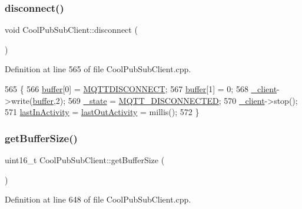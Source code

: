 \subsubsection{\texorpdfstring{disconnect()}{disconnect()}}
{\footnotesize\ttfamily void Cool\+Pub\+Sub\+Client\+::disconnect (\begin{DoxyParamCaption}{ }\end{DoxyParamCaption})}



Definition at line 565 of file Cool\+Pub\+Sub\+Client.\+cpp.


\begin{DoxyCode}
565                                   \{
566     \hyperlink{class_cool_pub_sub_client_a7e8bcc6096626916046a51bebadc7851}{buffer}[0] = \hyperlink{_cool_pub_sub_client_8h_a4605328c2c5c52f38b6c289bef505f84}{MQTTDISCONNECT};
567     \hyperlink{class_cool_pub_sub_client_a7e8bcc6096626916046a51bebadc7851}{buffer}[1] = 0;
568     \hyperlink{class_cool_pub_sub_client_a487a65bafb6e3b8e9ab544b13a8878a0}{\_client}->write(\hyperlink{class_cool_pub_sub_client_a7e8bcc6096626916046a51bebadc7851}{buffer},2);
569     \hyperlink{class_cool_pub_sub_client_aa1953b601206252a30efa5b114eb3e1a}{\_state} = \hyperlink{_cool_pub_sub_client_8h_adaf86a906a305dd129164982d50111b3}{MQTT\_DISCONNECTED};
570     \hyperlink{class_cool_pub_sub_client_a487a65bafb6e3b8e9ab544b13a8878a0}{\_client}->stop();
571     \hyperlink{class_cool_pub_sub_client_abfc862f98f6a1a36232e28fd946d8902}{lastInActivity} = \hyperlink{class_cool_pub_sub_client_a8930f17c8a384f2e7600b5b854d67506}{lastOutActivity} = millis();
572 \}
\end{DoxyCode}
\mbox{\label{class_cool_pub_sub_client_ac3c8bf1daed573d1ffa8b5c1fcb13f98}} 
\subsubsection{\texorpdfstring{get\+Buffer\+Size()}{getBufferSize()}}
{\footnotesize\ttfamily uint16\+\_\+t Cool\+Pub\+Sub\+Client\+::get\+Buffer\+Size (\begin{DoxyParamCaption}{ }\end{DoxyParamCaption})}



Definition at line 648 of file Cool\+Pub\+Sub\+Client.\+cpp.


